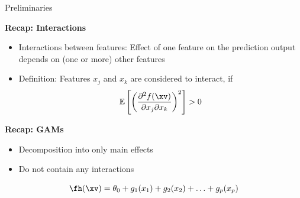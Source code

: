 \documentclass[11pt,compress,t,notes=noshow, aspectratio=169, xcolor=table]{beamer}
\begin{document}
\begin{frame}{Preliminaries}

    \textbf{Recap: Interactions}
    \begin{itemize}
        \item Interactions between features: Effect of one feature on the prediction output depends on (one or more) other features
        \item Definition: Features $x_j$  and $x_k$ are considered to interact, if
        $$
        \mathbb{E} \left[ \left( \frac{\partial^2 f(\xv)}{\partial x_j \partial x_k} \right)^2 \right] > 0
        $$
    \end{itemize}
    
    \pause
    \textbf{Recap: GAMs}
    \begin{itemize}
        \item Decomposition into only main effects
        \item Do not contain any interactions
    \end{itemize}
    $$
    \fh (\xv) = \theta_0 + g_1(x_1) + g_2(x_2) + \ldots + g_p(x_p)
    $$



\end{frame}
\end{document}
